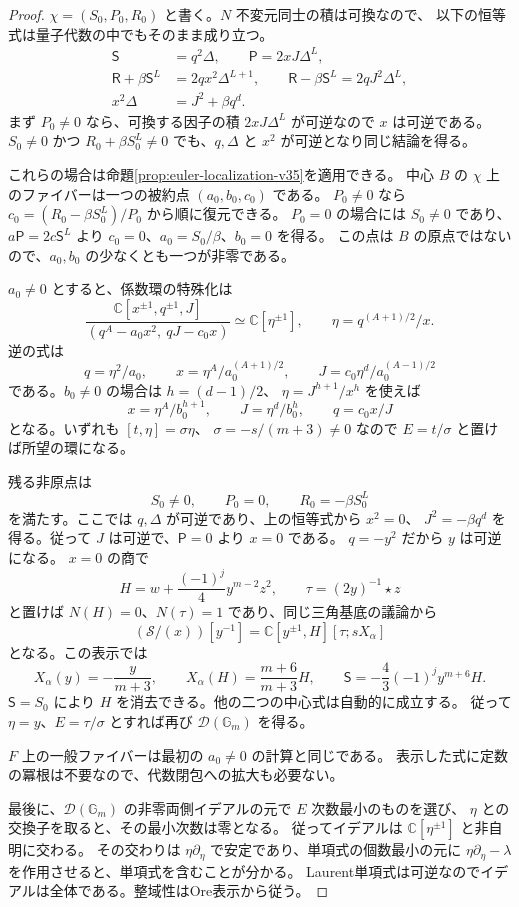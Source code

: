 \begin{proof}
$\chi=(S_0,P_0,R_0)$ と書く。$N$ 不変元同士の積は可換なので、
以下の恒等式は量子代数の中でもそのまま成り立つ。
\begin{align*}
 \mathsf S&=q^2\Delta,\qquad
 \mathsf P=2xJ\Delta^L,\\
 \mathsf R+\beta\mathsf S^L&=2q x^2\Delta^{L+1},\qquad
 \mathsf R-\beta\mathsf S^L=2q J^2\Delta^L,\\
 x^2\Delta&=J^2+\beta q^d.
\end{align*}
まず $P_0\ne0$ なら、可換する因子の積 $2xJ\Delta^L$ が可逆なので $x$ は可逆である。
$S_0\ne0$ かつ $R_0+\beta S_0^L\ne0$ でも、$q,\Delta$ と $x^2$ が可逆となり同じ結論を得る。

これらの場合は命題\ref{prop:euler-localization-v35}を適用できる。
中心 $B$ の $\chi$ 上のファイバーは一つの被約点 $(a_0,b_0,c_0)$ である。
$P_0\ne0$ なら $c_0=(R_0-\beta S_0^L)/P_0$ から順に復元できる。
$P_0=0$ の場合には $S_0\ne0$ であり、
$a\mathsf P=2c\mathsf S^L$ より $c_0=0$、$a_0=S_0/\beta$、$b_0=0$ を得る。
この点は $B$ の原点ではないので、$a_0,b_0$ の少なくとも一つが非零である。

$a_0\ne0$ とすると、係数環の特殊化は
\[
 \frac{\mathbb C[x^{\pm1},q^{\pm1},J]}
      {(q^A-a_0x^2,\ qJ-c_0x)}
 \simeq\mathbb C[\eta^{\pm1}],\qquad
 \eta=q^{(A+1)/2}/x.
\]
逆の式は
\[
 q=\eta^2/a_0,\qquad
 x=\eta^A/a_0^{(A+1)/2},\qquad
 J=c_0\eta^d/a_0^{(A-1)/2}
\]
である。$b_0\ne0$ の場合は $h=(d-1)/2$、
$\eta=J^{h+1}/x^h$ を使えば
\[
 x=\eta^A/b_0^{h+1},\qquad J=\eta^d/b_0^h,
 \qquad q=c_0x/J
\]
となる。いずれも $[t,\eta]=\sigma\eta$、
$\sigma=-s/(m+3)\ne0$ なので $E=t/\sigma$ と置けば所望の環になる。

残る非原点は
\[
 S_0\ne0,\qquad P_0=0,\qquad R_0=-\beta S_0^L
\]
を満たす。ここでは $q,\Delta$ が可逆であり、上の恒等式から $x^2=0$、
$J^2=-\beta q^d$ を得る。従って $J$ は可逆で、$\mathsf P=0$ より $x=0$ である。
$q=-y^2$ だから $y$ は可逆になる。
$x=0$ の商で
\[
 H=w+\frac{(-1)^j}{4}y^{m-2}z^2,\qquad
 \tau=(2y)^{-1}\star z
\]
と置けば $N(H)=0$、$N(\tau)=1$ であり、同じ三角基底の議論から
\[
 (\mathcal S/(x))[y^{-1}]
 =\mathbb C[y^{\pm1},H][\tau;sX_\alpha]
\]
となる。この表示では
\[
 X_\alpha(y)=-\frac{y}{m+3},\qquad
 X_\alpha(H)=\frac{m+6}{m+3}H,\qquad
 \mathsf S=-\frac43(-1)^j y^{m+6}H.
\]
$\mathsf S=S_0$ により $H$ を消去できる。他の二つの中心式は自動的に成立する。
従って $\eta=y$、$E=\tau/\sigma$ とすれば再び $\mathcal D(\mathbb G_m)$ を得る。

$F$ 上の一般ファイバーは最初の $a_0\ne0$ の計算と同じである。
表示した式に定数の冪根は不要なので、代数閉包への拡大も必要ない。

最後に、$\mathcal D(\mathbb G_m)$ の非零両側イデアルの元で $E$ 次数最小のものを選び、
$\eta$ との交換子を取ると、その最小次数は零となる。
従ってイデアルは $\mathbb C[\eta^{\pm1}]$ と非自明に交わる。
その交わりは $\eta\partial_\eta$ で安定であり、単項式の個数最小の元に
$\eta\partial_\eta-\lambda$ を作用させると、単項式を含むことが分かる。
Laurent単項式は可逆なのでイデアルは全体である。整域性はOre表示から従う。
\end{proof}


